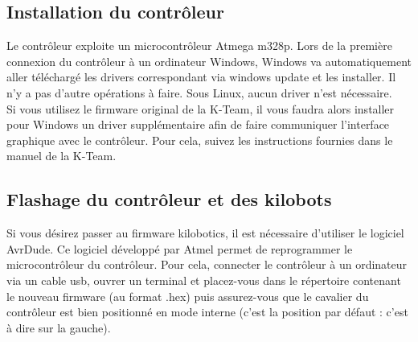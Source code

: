 \documentclass[a4paper,8pt]{report}
\begin{document}
\subsection*{Installation du contr\^oleur}\label{sec:name}

Le contr\^oleur exploite un microcontr\^oleur Atmega m328p. Lors de la première connexion du contr\^oleur \`a un ordinateur Windows, Windows va automatiquement aller t\'el\'echarg\'e les drivers correspondant via windows update et les installer. Il n'y a pas d'autre op\'erations \`a faire. Sous Linux, aucun driver n'est n\'ecessaire.\\
Si vous utilisez le firmware original de la K-Team, il vous faudra alors installer pour Windows un driver suppl\'ementaire afin de faire communiquer l'interface graphique avec le contr\^oleur. Pour cela, suivez les instructions fournies dans le manuel de la K-Team.

\begin{center}
\end{center}

\subsection*{Flashage du contr\^oleur et des kilobots}\label{sec:name}

Si vous d\'esirez passer au firmware kilobotics, il est n\'ecessaire d'utiliser le logiciel AvrDude. Ce logiciel d\'evelopp\'e par Atmel permet de reprogrammer le microcontr\^oleur du contr\^oleur. Pour cela, connecter le contr\^oleur \`a un ordinateur via un cable usb, ouvrer un terminal et placez-vous dans le r\'epertoire contenant le nouveau firmware (au format .hex) puis assurez-vous que le cavalier du contr\^oleur est bien positionn\'e en mode interne (c'est la position par d\'efaut : c'est \`a dire sur la gauche). \\
\end{document}
